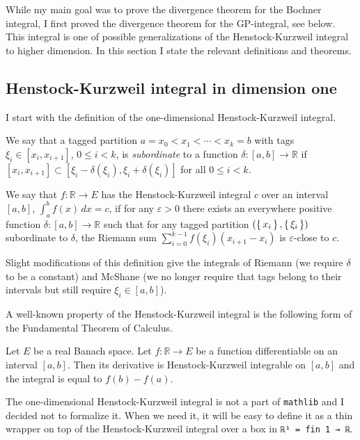 \documentclass[a4paper,UKenglish,cleveref, autoref, thm-restate]{lipics-v2021}
\newcommand{\bbR}{\mathbb{R}}
\newcommand{\eps}{\varepsilon}
\begin{document}
While my main goal was to prove the divergence theorem for the Bochner
integral, I first proved the divergence theorem for the GP-integral,
see below. This integral is one of possible generalizations of the
Henstock-Kurzweil integral to higher dimension. In this section I
state the relevant definitions and theorems.

\subsection{Henstock-Kurzweil integral in dimension one}\label{sec:HK-integral-dim1}
I start with the definition of the one-dimensional Henstock-Kurzweil
integral.

\begin{definition}
  We say that a tagged partition \(a=x_{0}<x_{1}<\cdots<x_{k}=b\) with
  tags \(\xi_{i}\in[x_{i}, x_{i+1}]\), \(0\le i<k\), is
  \emph{subordinate} to a function \(\delta\colon[a, b]\to \bbR\) if
  \([x_{i}, x_{i+1}]\subset [\xi_{i}-\delta(\xi_{i}),
  \xi_{i}+\delta(\xi_{i})]\) for all \(0\le i<k\).

  We say that \(f\colon \bbR\to E\) has the Henstock-Kurzweil integral
  \(c\) over an interval \([a, b]\), \(\int_{a}^{b}f(x)\,dx=c\), if
  for any \(\eps>0\) there exists an everywhere positive function
  \(\delta\colon [a, b]\to \bbR\) such that for any tagged partition
  \((\set{x_{i}}, \set{\xi_{i}})\) subordinate to \(\delta\), the
  Riemann sum
  \(\displaystyle\sum_{i=0}^{k-1}f(\xi_{i})(x_{i+1}-x_{i}) \) is
  \(\eps\)-close to \(c\).
\end{definition}

Slight modifications of this definition give the integrals of Riemann
(we require \(\delta\) to be a constant) and McShane (we no longer
require that tags belong to their intervals but still require
\(\xi_{i}\in[a, b]\)).

A well-known property of the Henstock-Kurzweil integral is the
following form of the Fundamental Theorem of Calculus.
\begin{theorem}
  Let \(E\) be a real Banach space. Let \(f\colon \bbR\to E\) be a
  function differentiable on an interval \([a, b]\). Then its
  derivative is Henstock-Kurzweil integrable on \([a, b]\) and the
  integral is equal to \(f(b)-f(a)\).
\end{theorem}

The one-dimensional Henstock-Kurzweil integral is not a part of
\texttt{mathlib} and I decided not to formalize it. When we need it,
it will be easy to define it as a thin wrapper on top of the
Henstock-Kurzweil integral over a box in \lstinline+ℝ¹ = fin 1 → ℝ+.
\end{document}
